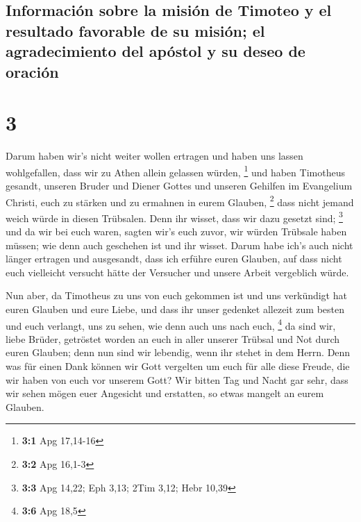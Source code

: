\hypertarget{informaciuxf3n-sobre-la-misiuxf3n-de-timoteo-y-el-resultado-favorable-de-su-misiuxf3n-el-agradecimiento-del-apuxf3stol-y-su-deseo-de-oraciuxf3n}{%
\subsection{Información sobre la misión de Timoteo y el resultado
favorable de su misión; el agradecimiento del apóstol y su deseo de
oración}\label{informaciuxf3n-sobre-la-misiuxf3n-de-timoteo-y-el-resultado-favorable-de-su-misiuxf3n-el-agradecimiento-del-apuxf3stol-y-su-deseo-de-oraciuxf3n}}

\hypertarget{section-2}{%
\section{3}\label{section-2}}

 Darum haben wir's nicht weiter wollen ertragen und haben
uns lassen wohlgefallen, dass wir zu Athen allein gelassen würden,
\footnote{\textbf{3:1} Apg 17,14-16}  und haben Timotheus
gesandt, unseren Bruder und Diener Gottes und unseren Gehilfen im
Evangelium Christi, euch zu stärken und zu ermahnen in eurem Glauben,
\footnote{\textbf{3:2} Apg 16,1-3}  dass nicht jemand
weich würde in diesen Trübsalen. Denn ihr wisset, dass wir dazu gesetzt
sind; \footnote{\textbf{3:3} Apg 14,22; Eph 3,13; 2Tim 3,12; Hebr 10,39}
 und da wir bei euch waren, sagten wir's euch zuvor, wir
würden Trübsale haben müssen; wie denn auch geschehen ist und ihr
wisset.  Darum habe ich's auch nicht länger ertragen und
ausgesandt, dass ich erführe euren Glauben, auf dass nicht euch
vielleicht versucht hätte der Versucher und unsere Arbeit vergeblich
würde.

 Nun aber, da Timotheus zu uns von euch gekommen ist und
uns verkündigt hat euren Glauben und eure Liebe, und dass ihr unser
gedenket allezeit zum besten und euch verlangt, uns zu sehen, wie denn
auch uns nach euch, \footnote{\textbf{3:6} Apg 18,5}  da
sind wir, liebe Brüder, getröstet worden an euch in aller unserer
Trübsal und Not durch euren Glauben;  denn nun sind wir
lebendig, wenn ihr stehet in dem Herrn.  Denn was für
einen Dank können wir Gott vergelten um euch für alle diese Freude, die
wir haben von euch vor unserem Gott?  Wir bitten Tag und
Nacht gar sehr, dass wir sehen mögen euer Angesicht und erstatten, so
etwas mangelt an eurem Glauben.

